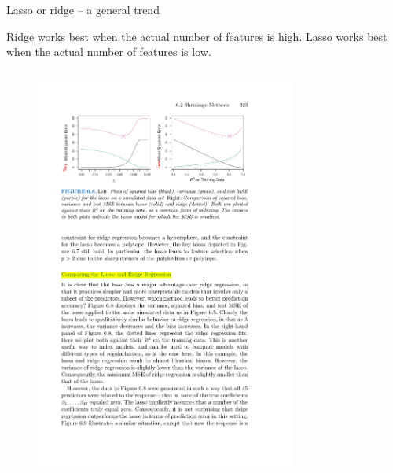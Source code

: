 \documentclass[mathserif, handout, aspectratio=169]{beamer}
\begin{document}
\begin{frame}{Lasso or ridge -- a general trend}

Ridge works best when the actual number of features is high.  Lasso works best when the actual number of features is low. 
\vspace{5mm}
\begin{columns}
\begin{figure}
\includegraphics[scale=1]{lasso-v-ridge-45variables}
\end{figure}
\begin{figure}

\end{figure}
\end{columns}
\end{frame}
\end{document}
